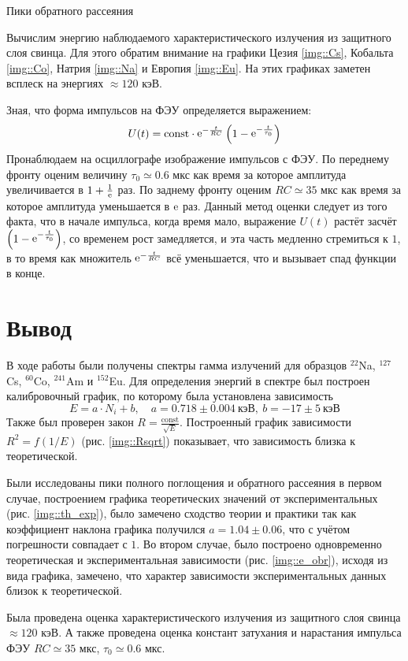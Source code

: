 \begin{table}[h!]
  \centering
  \caption{Пики обратного рассеяния}
  
\end{table}

Вычислим энергию наблюдаемого характеристического излучения из защитного слоя
свинца. Для этого обратим внимание на графики Цезия \ref{img::Cs}, Кобальта
\ref{img::Co}, Натрия \ref{img::Na} и Европия \ref{img::Eu}.
На этих графиках заметен всплеск на энергиях $\approx 120$ кэВ.

Зная, что форма импульсов на ФЭУ определяется выражением:
\[
  U(t) = \text{const} \cdot \mathop{\mathrm e}\nolimits^{-\frac{t}{RC}}
  \left(1 - \mathop{\mathrm e}\nolimits^{ - \frac{t}{\tau_0}}\right)
\]
Пронаблюдаем на осциллографе изображение импульсов с ФЭУ. По переднему фронту
оценим величину $\tau_0 \simeq 0.6$ мкс как время за которое амплитуда
увеличивается в $1 + \frac{1}{\mathop{\mathrm e}\nolimits}$ раз. По заднему фронту оценим $RC \simeq 35$ мкс как время
за которое амплитуда уменьшается в $\mathop{\mathrm e}\nolimits$ раз.
Данный метод оценки следует из того факта, что в начале импульса,
когда время мало, выражение $U(t)$ растёт засчёт $\left(1 - \mathop{\mathrm e}\nolimits^{ - \frac{t}{\tau_0}}\right)$,
со временем рост замедляется, и эта часть медленно стремиться к $1$, в то время как множитель
$\mathop{\mathrm e}\nolimits^{-\frac{t}{RC}}$ всё уменьшается, что и вызывает спад функции в конце.

\section{Вывод}

В ходе работы были получены спектры гамма излучений для образцов
$^{22}$Na, $^{127}$Cs, $^{60}$Co, $^{241}$Am и $^{152}$Eu.
Для определения энергий в спектре был построен калибровочный график,
по которому была установлена зависимость
\[
  E = a \cdot  N_i + b, \quad
  a = 0.718 \pm 0.004 \: \text{кэВ}, \:
  b = - 17 \pm 5 \:\text{кэВ}
\]
Также был проверен закон $R = \frac{\text{const}}{\sqrt{E}}$.
Построенный график зависимости $R^2 = f(1/E)$ (рис. \ref{img::Rsqrt})
показывает, что зависимость близка к теоретической.

Были исследованы пики полного поглощения и обратного рассеяния
в первом случае, построением графика теоретических значений от экспериментальных
(рис. \ref{img::th_exp}), было замечено сходство теории и практики
так как коэффициент наклона графика получился
$a = 1.04 \pm 0.06$, что с учётом погрешности совпадает с $1$.
Во втором случае, было построено одновременно теоретическая и экспериментальная
зависимости (рис. \ref{img::e_obr}), исходя из вида графика, замечено,
что характер зависимости экспериментальных данных близок к теоретической.

Была проведена оценка характеристического излучения из защитного слоя
свинца $\approx 120$ кэВ. А также проведена оценка констант
затухания и нарастания импульса ФЭУ
$RC \simeq 35$ мкс,
$\tau_0 \simeq 0.6$ мкс.
